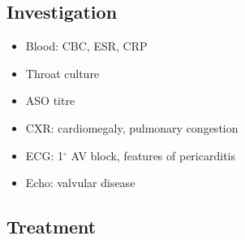 \documentclass[
  12pt,
]{memoir}
\providecommand{\tightlist}{%
  \setlength{\itemsep}{0pt}\setlength{\parskip}{0pt}}
\begin{document}
\hypertarget{investigation-8}{%
\subsection{Investigation}\label{investigation-8}}

\begin{itemize}
\tightlist
\item
  Blood: CBC, ESR, CRP
\item
  Throat culture
\item
  ASO titre
\item
  CXR: cardiomegaly, pulmonary congestion
\item
  ECG: 1\(^\circ\) AV block, features of pericarditis
\item
  Echo: valvular disease
\end{itemize}

\hypertarget{treatment}{%
\subsection{Treatment}\label{treatment}}
\end{document}
